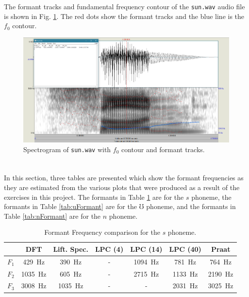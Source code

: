 \documentclass[letterpaper]{article}
\begin{document}
\newpage


\section{}
The formant tracks and fundamental frequency contour of the \texttt{sun.wav} audio file is shown in Fig. \ref{praat}. The red dots show the formant tracks and the blue line is the $f_0$ contour.
\begin{figure}[h!]
\centering
\includegraphics[width=\textwidth]{part9praat}
\caption{Spectrogram of \texttt{sun.wav} with $f_0$ contour and formant tracks.}
\label{praat}
\end{figure}


\newpage
\section{}
In this section, three tables are presented which show the formant frequencies as they are estimated from the various plots that were produced as a result of the exercises in this project. The formants in Table \ref{tab:sFormant} are for the $s$ phoneme, the formants in Table \ref{tab:uFormant} are for the $\mho$ phoneme, and the formants in Table \ref{tab:nFormant} are for the $n$ phoneme.


\begin{table}[h]
    \centering
    \begin{tabular}{c||c|c|c|c|c||c}
          & DFT & Lift. Spec. & LPC (4) & LPC (14) & LPC (40) & Praat \\
    \hline
    \hline
    $F_1$ & 429~Hz &    390~Hz   &  -   &  1094~Hz   &  781~Hz  &  764~Hz  \\
    $F_2$ & 1035~Hz &   605~Hz   &   -  &  2715~Hz   &  1133~Hz &  2190~Hz \\
    $F_3$ & 3008~Hz &   1035~Hz  &   - &     -   &  2031~Hz &  3025~Hz\\
    \end{tabular}
    \caption{Formant Frequency comparison for the $s$ phoneme.}
    \label{tab:sFormant}
\end{table}
\end{document}
